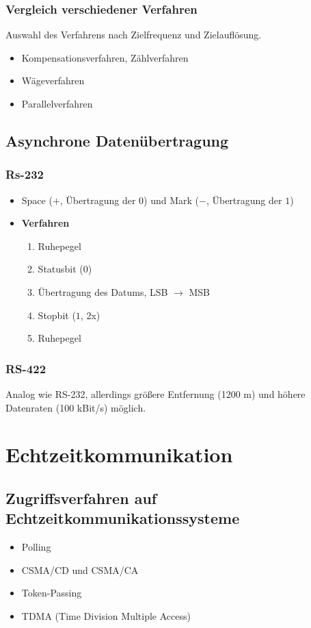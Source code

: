 \subsubsection{Vergleich verschiedener Verfahren}
Auswahl des Verfahrens nach Zielfrequenz und Zielauflösung.
\begin{itemize}
	\item Kompensationsverfahren, Zählverfahren
	\item Wägeverfahren
	\item Parallelverfahren
\end{itemize}


\subsection{Asynchrone Datenübertragung}

\subsubsection{Rs-232}

\begin{itemize}
	\item Space ($+$, Übertragung der $0$) und Mark ($-$, Übertragung der $1$)
	\item \textbf{Verfahren}
	\begin{enumerate}
		\item Ruhepegel
		\item Statusbit ($0$)
		\item Übertragung des Datums, LSB $\rightarrow$ MSB
		\item Stopbit ($1$, 2x)
		\item Ruhepegel
	\end{enumerate}
\end{itemize}

\subsubsection{RS-422}
Analog wie RS-232, allerdings größere Entfernung (1200 m) und höhere Datenraten (100 kBit/s) möglich.



\section{Echtzeitkommunikation}

\subsection{Zugriffsverfahren auf Echtzeitkommunikationssysteme}
\begin{itemize}
	\item Polling
	\item CSMA/CD und CSMA/CA
	\item Token-Passing
	\item TDMA (Time Division Multiple Access)
\end{itemize}



